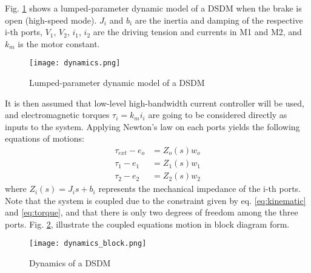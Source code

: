 Fig. \ref{fig:dynamics} shows a lumped-parameter dynamic model of a DSDM when the brake is open (high-speed mode). $J_i$ and $b_i$ are the inertia and damping of the respective i-th ports, $V_1$, $V_2$, $i_1$, $i_2$ are the driving tension and currents in M1 and M2, and $k_m$ is the motor constant. 

\begin{figure}[htb]
	\centering
		\texttt{[image: dynamics.png]}
	\caption{Lumped-parameter dynamic model of a DSDM}
	\label{fig:dynamics}
\end{figure}

It is then assumed that low-level high-bandwidth current controller will be used, and electromagnetic torques $\tau_i = k_m i_i$ are going to be considered directly as inputs to the system. Applying Newton's law on each ports yields the following equations of motions:
%
\begin{align}
\tau_{ext}  - e_o &= Z_o(s) w_o \\
\tau_{1}    - e_1 &= Z_1(s) w_1 \\
\tau_{2}    - e_2 &= Z_2(s) w_2
\end{align}
%
where $Z_i(s) = J_i s + b_i$ represents the mechanical impedance of the i-th ports. Note that the system is coupled due to the constraint given by eq. \eqref{eq:kinematic} and \eqref{eq:torque}, and that there is only two degrees of freedom among the three ports. Fig. \ref{fig:dynamics_block}, illustrate the coupled equations motion in block diagram form.

\begin{figure}[htp]
	\centering
		\texttt{[image: dynamics\_block.png]}
	\caption{Dynamics of a DSDM}
	\label{fig:dynamics_block}
\end{figure}

